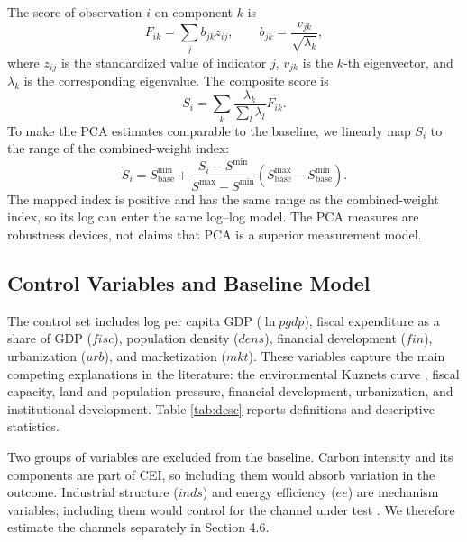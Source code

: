 \documentclass[economies,article,submit,moreauthors]{Definitions/mdpi}
\begin{document}
The score of observation $i$ on component $k$ is
\begin{equation}
F_{ik}=\sum_j b_{jk}z_{ij},
\qquad
b_{jk}=\frac{v_{jk}}{\sqrt{\lambda_k}},
\label{eq:pca_score}
\end{equation}
where $z_{ij}$ is the standardized value of indicator $j$, $v_{jk}$ is the $k$-th eigenvector, and $\lambda_k$ is the corresponding eigenvalue. The composite score is
\begin{equation}
S_i=\sum_k \frac{\lambda_k}{\sum_l \lambda_l}F_{ik}.
\label{eq:pca_composite}
\end{equation}
To make the PCA estimates comparable to the baseline, we linearly map $S_i$ to the range of the combined-weight index:
\begin{equation}
\tilde S_i=S^{\min}_{\mathrm{base}}+\frac{S_i-S^{\min}}{S^{\max}-S^{\min}}
\left(S^{\max}_{\mathrm{base}}-S^{\min}_{\mathrm{base}}\right).
\label{eq:pca_map}
\end{equation}
The mapped index is positive and has the same range as the combined-weight index, so its log can enter the same log--log model. The PCA measures are robustness devices, not claims that PCA is a superior measurement model.

\subsection{Control Variables and Baseline Model}

The control set includes log per capita GDP ($\ln pgdp$), fiscal expenditure as a share of GDP ($fisc$), population density ($dens$), financial development ($fin$), urbanization ($urb$), and marketization ($mkt$). These variables capture the main competing explanations in the literature: the environmental Kuznets curve \citep{grossman1991,dietz1997}, fiscal capacity, land and population pressure, financial development, urbanization, and institutional development. Table \ref{tab:desc} reports definitions and descriptive statistics.

Two groups of variables are excluded from the baseline. Carbon intensity and its components are part of CEI, so including them would absorb variation in the outcome. Industrial structure ($inds$) and energy efficiency ($ee$) are mechanism variables; including them would control for the channel under test \citep{angrist2009,schisterman2009}. We therefore estimate the channels separately in Section 4.6.
\end{document}
